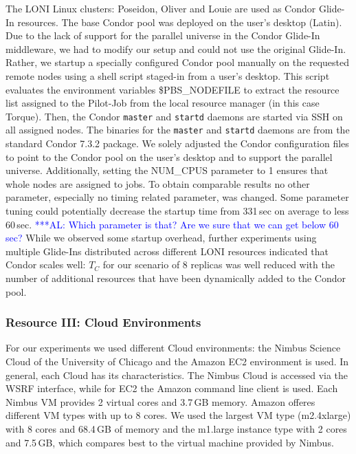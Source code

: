 \documentclass[conference,final]{IEEEtran}
\newcommand{\tc}{$T_{C}$ }
\newcommand{\alnote}[1]{ {\textcolor{blue} { ***AL: #1 }}}
\newcommand{\alnote}[1]{}
\begin{document}
The LONI Linux clusters: Poseidon, Oliver and Louie are used as Condor Glide-In 
resources. The base Condor pool was deployed on the user's desktop
(Latin). Due to the lack of support for the parallel universe in the
Condor Glide-In middleware, we had to modify our setup and could not
use the original Glide-In. Rather, we startup a specially configured 
Condor pool manually on the requested remote nodes using 
a shell script staged-in from a user's desktop. This script evaluates 
the environment variables \$PBS\_NODEFILE to extract the resource list assigned to
the Pilot-Job from the local resource manager (in this case Torque). Then, the 
Condor \texttt{master} and \texttt{startd} daemons are started 
via SSH on all assigned nodes. The binaries for the \texttt{master} and 
\texttt{startd} daemons are from the standard Condor 7.3.2 package. 
We solely adjusted the Condor configuration files to point to the Condor
pool on the user's desktop and to support the parallel universe.
Additionally, setting the NUM\_CPUS parameter to 1 ensures that 
whole nodes are assigned to jobs.
To obtain comparable results no other parameter, especially no timing related parameter, 
was changed. Some parameter tuning could potentially decrease the
startup time from 331\,sec on average to less 60\,sec. \alnote{Which parameter is that? Are
we sure that we can get below 60 sec?} While we observed
some startup overhead, further experiments using multiple Glide-Ins distributed
across different LONI resources indicated that Condor scales well: \tc for our
scenario of 8 replicas was well reduced with the number of additional resources that have
been dynamically added to the Condor pool. 


\subsubsection*{Resource III: Cloud Environments}

For our experiments we used different Cloud environments: 
the Nimbus Science Cloud of the University of Chicago and the 
Amazon EC2 environment is used. In general, each Cloud has 
its characteristics. The Nimbus Cloud is accessed via the WSRF
interface, while for EC2 the Amazon command line 
client is used. Each Nimbus VM provides 2 virtual cores and 3.7\,GB memory. 
Amazon offeres different VM types with up to 8 cores. We used 
the largest VM type (m2.4xlarge) with 8 cores and 68.4\,GB of memory
and the m1.large instance type with 2 cores and 7.5\,GB, which compares
best to the virtual machine provided by Nimbus. 
\end{document}
